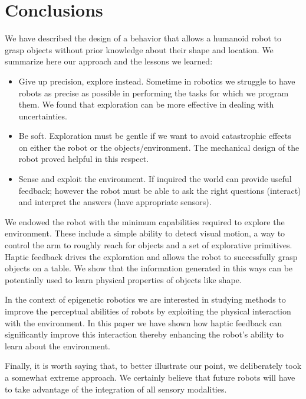 \section{Conclusions}
\label{sec:conclusions}

We have described the design of a behavior that allows a humanoid
robot to grasp objects without prior knowledge about their shape
and location. We summarize here our approach and the lessons 
we learned:
%
\begin{itemize}
%
\item Give up precision, explore instead. Sometime in robotics
we struggle to have robots as precise as possible in performing
the tasks for which we program them. We found that exploration
can be more effective in dealing with uncertainties.
%
\item Be soft. Exploration must be gentle if we want to avoid
catastrophic effects on either the robot or the
objects/environment. The mechanical design of the robot proved
helpful in this respect.
%
\item Sense and exploit the environment. If inquired the world
can provide useful feedback; however the robot must be able
to ask the right questions (interact) and interpret the answers
(have appropriate sensors).
%
\end{itemize}

We endowed the robot with the minimum capabilities required to explore
the environment. These include a simple ability to detect visual
motion, a way to control the arm to roughly reach for objects and a
set of explorative primitives. Haptic feedback drives the
exploration and allows the robot to successfully grasp objects on
a table. We show that the information generated in this ways
can be potentially used to learn physical properties of objects like shape.

In the context of epigenetic robotics we are interested in studying
methods to improve the perceptual abilities of robots by exploiting the
physical interaction with the environment. In this paper we have shown
how haptic feedback can significantly improve this interaction thereby
enhancing the robot's ability to learn about the environment.

Finally, it is worth saying that, to better illustrate our point, we
deliberately took a somewhat extreme approach. We certainly believe 
that future robots will have to take advantage of the integration of
all sensory modalities.
